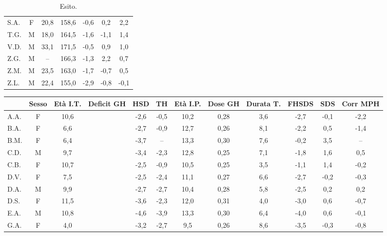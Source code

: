 \begin{table}[!h]
\begin{center}
\begin{tabular}{lcccccc}
S.A.	& F & 20,8 & 158,6 & -0,6  & 0,2   & 2,2     \\
T.G.    & M & 18,0 & 164,5 & -1,6  & -1,1  & 1,4    \\
V.D.	& M & 33,1 & 171,5 & -0,5  & 0,9   & 1,0     \\
Z.G.	& M & --   & 166,3 & -1,3  & 2,2   & 0,7   \\
Z.M.	& M & 23,5 & 163,0 & -1,7  & -0,7  & 0,5     \\
Z.L.	& M & 22,4 & 155,0 & -2,9  & -0,8  & -0,1    \\
\bottomrule
\end{tabular}
\end{center}
\caption{Esito.}
\label{tab:Esito}
\end{table}

\begin{sidewaystable}
\centering
\begin{tabular}{lccccccccccc}
\toprule
 	& Sesso & Età I.T. & Deficit GH & HSD %
 	& TH %
 	& Età I.P.
 	& Dose GH
 	& Durata T.
 	& FHSDS
 	& \Delta SDS
 	& Corr MPH
 	\\
\midrule                                
A.A. & F & 10,6 &  		& -2,6 & -0,5 & 10,2 & 0,28 & 3,6 & -2,7 & -0,1 & -2,2                    \\
B.A. & F & 6,6  & \checkmark 	& -2,7 & -0,9 & 12,7 & 0,26 & 8,1 & -2,2 & 0,5  & -1,4                    \\
B.M. & F & 6,4  & \checkmark 	& -3,7 & --   & 13,3 & 0,30 & 7,6 & -0,2 & 3,5  & --                      \\
C.D. & M & 9,7  & \checkmark 	& -3,4 & -2,3 & 12,8 & 0,25 & 7,1 & -1,8 & 1,6  & 0,5                     \\
C.B. & F & 10,7 &  		& -2,5 & -0,9 & 10,5 & 0,25 & 3,5 & -1,1 & 1,4  & -0,2                           \\
D.V.& F & 7,5  & \checkmark 	& -2,5 & -2,4 & 11,1 & 0,27 & 6,6 & -2,7 & -0,2 & -0,3                    \\
D.A. & M & 9,9  &  		& -2,7 & -2,7 & 10,4 & 0,28 & 5,8 & -2,5 & 0,2     & 0,2                               \\
D.S.& F & 11,5 & \checkmark 	& -3,6 & -2,3 & 12,0 & 0,31 & 4,0 & -3,0 & 0,6  & -0,7                    \\
E.A. & M & 10,8 &  		& -4,6 & -3,9 & 13,3 & 0,30 & 6,4 & -4,0 & 0,6  & -0,1                           \\
G.A. & F & 4,0  &  		& -3,2 & -2,7 & 9,5  & 0,26 & 8,6 & -3,5 & -0,3 & -0,8                               \\

\end{tabular}
\end{sidewaystable}
